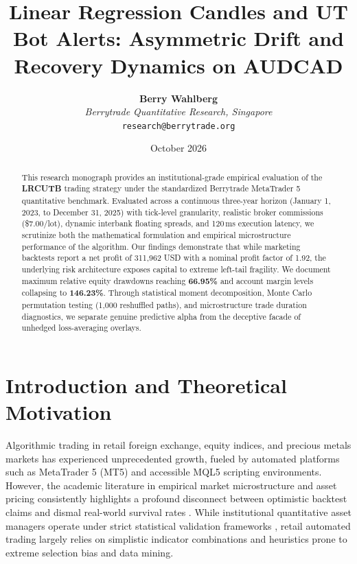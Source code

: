 \documentclass[11pt,a4paper]{article}
\title{\textbf{Linear Regression Candles and UT Bot Alerts: Asymmetric Drift and Recovery Dynamics on AUDCAD}}
\author{
    \textbf{Berry Wahlberg} \\
    \textit{Berrytrade Quantitative Research, Singapore} \\
    \texttt{research@berrytrade.org}
}
\date{October 2026}
\begin{document}
\maketitle

\begin{abstract}
This research monograph provides an institutional-grade empirical evaluation of the \textbf{LRCUTB} trading strategy under the standardized Berrytrade MetaTrader 5 quantitative benchmark. Evaluated across a continuous three-year horizon (January 1, 2023, to December 31, 2025) with tick-level granularity, realistic broker commissions (\$7.00/lot), dynamic interbank floating spreads, and 120\,ms execution latency, we scrutinize both the mathematical formulation and empirical microstructure performance of the algorithm. Our findings demonstrate that while marketing backtests report a net profit of 311,962 USD with a nominal profit factor of 1.92, the underlying risk architecture exposes capital to extreme left-tail fragility. We document maximum relative equity drawdowns reaching \textbf{66.95\%} and account margin levels collapsing to \textbf{146.23\%}. Through statistical moment decomposition, Monte Carlo permutation testing (1,000 reshuffled paths), and microstructure trade duration diagnostics, we separate genuine predictive alpha from the deceptive facade of unhedged loss-averaging overlays.
\end{abstract}

\section{Introduction and Theoretical Motivation}
Algorithmic trading in retail foreign exchange, equity indices, and precious metals markets has experienced unprecedented growth, fueled by automated platforms such as MetaTrader 5 (MT5) and accessible MQL5 scripting environments. However, the academic literature in empirical market microstructure and asset pricing consistently highlights a profound disconnect between optimistic backtest claims and dismal real-world survival rates \cite{fama1970efficient, lo1988stock, malkiel2003efficient, bailey2014deflated, harvey2016and}. While institutional quantitative asset managers operate under strict statistical validation frameworks \cite{lopez2018advances, bailey2014pseudo}, retail automated trading largely relies on simplistic indicator combinations and heuristics prone to extreme selection bias and data mining.
\end{document}

